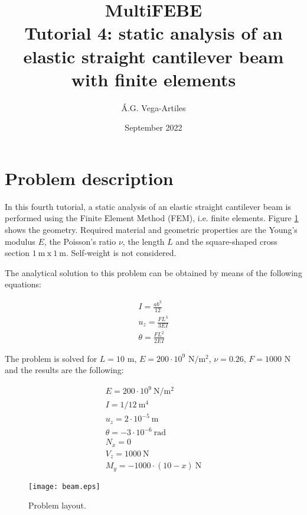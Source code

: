 \documentclass[a4]{article}
\title{MultiFEBE \\ Tutorial 4: static analysis of an elastic straight cantilever beam with finite elements}
\author{\'A.G. Vega-Artiles}
\date{September 2022}
\begin{document}
\maketitle

\tableofcontents 

\section{Problem description}

In this fourth tutorial, a static analysis of an elastic straight cantilever beam is performed using the Finite Element Method (FEM), i.e. finite elements. Figure \ref{fig:beam} shows the geometry. Required material and geometric properties are the Young's modulus $E$, the Poisson's ratio $\nu$, the length $L$ and the square-shaped cross section $1 \medspace \mathrm{m} \medspace \mathrm{x} \medspace 1 \medspace \mathrm{m}$. Self-weight is not considered. 

The analytical solution to this problem can be obtained by means of the following equations:

\begin{equation}
	\begin{array}{l}
		I = \frac{ab^3}{12} \\
		u_z = \frac{FL^3}{3EI} \\
		\theta = \frac{FL^2}{2EI}
	\end{array}
\end{equation}

The problem is solved for $L=10$ $\mathrm{m}$, $E=200\cdot 10^9$ $\mathrm{N/m^2}$, $\nu=0.26$, $F=1000$ $\mathrm{N}$ and the results are the following: 

\begin{equation}
	\begin{array}{l}
		E = 200\cdot 10^9 \medspace \mathrm{N/m^2} \\
		I = 1/12 \medspace \mathrm{m^4} \\
		u_z = 2\cdot 10^{-5} \medspace \mathrm{m}\\
		\theta =  -3\cdot 10^{-6} \medspace \mathrm{rad}\\
		N_{x} = 0\\
		V_{z} = 1000 \medspace \mathrm{N}\\
		M_{y} = -1000\cdot(10-x)\medspace \mathrm{N}
	\end{array}
\end{equation}

\begin{figure}[h]
	\centering
	\texttt{[image: beam.eps]}
	\caption{Problem layout.}
	\label{fig:beam}
\end{figure}
\end{document}
